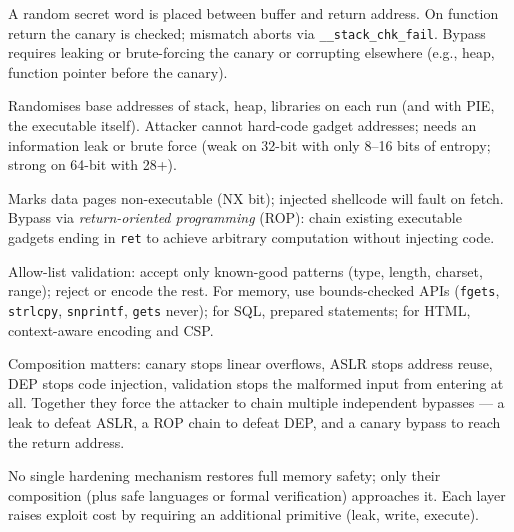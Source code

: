 \begin{description}[leftmargin=1.2em, itemsep=0.35em]
    \item[Stack canaries] A random secret word is placed between buffer and return address. On function return the canary is checked; mismatch aborts via \texttt{\_\_stack\_chk\_fail}. Bypass requires leaking or brute-forcing the canary or corrupting elsewhere (e.g., heap, function pointer before the canary).
    \item[ASLR] Randomises base addresses of stack, heap, libraries on each run (and with PIE, the executable itself). Attacker cannot hard-code gadget addresses; needs an information leak or brute force (weak on 32-bit with only 8--16 bits of entropy; strong on 64-bit with 28+).
    \item[DEP / W\textasciicircum X] Marks data pages non-executable (NX bit); injected shellcode will fault on fetch. Bypass via \emph{return-oriented programming} (ROP): chain existing executable gadgets ending in \texttt{ret} to achieve arbitrary computation without injecting code.
    \item[Input validation] Allow-list validation: accept only known-good patterns (type, length, charset, range); reject or encode the rest. For memory, use bounds-checked APIs (\texttt{fgets}, \texttt{strlcpy}, \texttt{snprintf}, \texttt{gets} never); for SQL, prepared statements; for HTML, context-aware encoding and CSP.
\end{description}

Composition matters: canary stops linear overflows, ASLR stops address reuse, DEP stops code injection, validation stops the malformed input from entering at all. Together they force the attacker to chain multiple independent bypasses --- a leak to defeat ASLR, a ROP chain to defeat DEP, and a canary bypass to reach the return address.

\begin{theorem}
No single hardening mechanism restores full memory safety; only their composition (plus safe languages or formal verification) approaches it. Each layer raises exploit cost by requiring an additional primitive (leak, write, execute).
\end{theorem}

